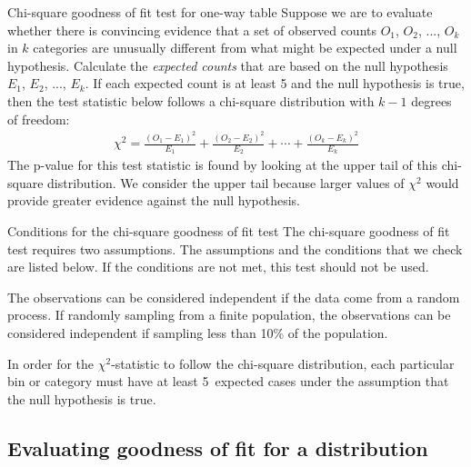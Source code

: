 \begin{onebox}{Chi-square goodness of fit test for one-way table}
Suppose we are to evaluate whether there is convincing evidence that a set of observed counts $O_1$, $O_2$, ..., $O_k$ in $k$ categories are unusually different from what might be expected under a null hypothesis. Calculate the \emph{expected counts} that are based on the null hypothesis $E_1$, $E_2$, ..., $E_k$. If each expected count is at least 5 and the null hypothesis is true, then the test statistic below follows a chi-square distribution with $k-1$ degrees of freedom:
\begin{align*}
\chi^2 = \frac{(O_1 - E_1)^2}{E_1} + \frac{(O_2 - E_2)^2}{E_2} + \cdots + \frac{(O_k - E_k)^2}{E_k}
\end{align*}
The p-value for this test statistic is found by looking at the upper tail of this chi-square distribution. We consider the upper tail because larger values of $\chi^2$ would provide greater evidence against the null hypothesis.\end{onebox}

\begin{onebox}{Conditions for the chi-square goodness of fit test}
The chi-square goodness of fit test requires two assumptions. The assumptions and the conditions that we check are listed below.  If the conditions are not met, this test should not be used.\vspace{-1mm}
\begin{description}
\setlength{\itemsep}{0mm}
\item[Independent.] The observations can be considered independent if the data come from a random process.  If randomly sampling from a finite population, the observations can be considered independent if sampling less than 10\% of the population.  
\item[Sampling distribution is chi-square.	] In order for the $\chi^2$-statistic to follow the chi-square distribution, each particular bin or category must have at least \mbox{5~expected} cases under the assumption that the null hypothesis is true.
\vspace{-2mm}
\end{description}
\end{onebox}


\D{\newpage}

\subsection{Evaluating goodness of fit for a distribution}

